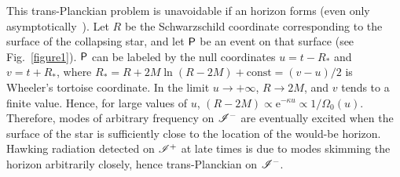 \documentclass[12pt]{article}
\begin{document}
This trans-Planckian problem is unavoidable if an horizon forms (even only asymptotically~\cite{Barcelo:2006np, Barcelo:2006uw}).  Let $R$ be the Schwarzschild coordinate corresponding to the surface of the collapsing star, and let $\sf P$ be an event on that surface (see Fig.~\ref{figure1}).  $\sf P$ can be labeled by the null coordinates $u=t-R_\ast$ and $v=t+R_\ast$, where $R_\ast=R+2M\ln\left(R-2M\right)+\mbox{const}=\left(v-u\right)/2$ is Wheeler's tortoise coordinate.  In the limit $u\to +\infty$, $R\to 2M$, and $v$ tends to a finite value.  Hence, for large values of $u$, $(R-2M)\propto \mathrm{e}^{-\kappa u}\propto 1/\Omega_0(u)$. Therefore, modes of arbitrary frequency on $\mathscr{I}^-$ are eventually excited when the surface of the star is sufficiently close to the location of the would-be horizon.  Hawking radiation detected on $\mathscr{I}^+$ at late times is due to modes skimming the horizon arbitrarily closely, hence trans-Planckian on $\mathscr{I}^-$.
\end{document}

